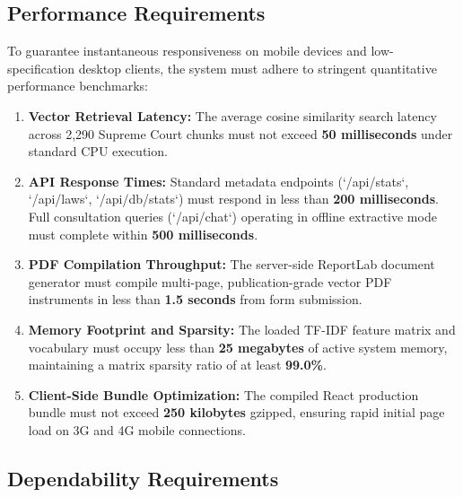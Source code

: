 \subsection{Performance Requirements}
\label{subsec:performance_requirements}

To guarantee instantaneous responsiveness on mobile devices and low-specification desktop clients, the system must adhere to stringent quantitative performance benchmarks:
\begin{enumerate}
    \item \textbf{Vector Retrieval Latency:} The average cosine similarity search latency across 2,290 Supreme Court chunks must not exceed \textbf{50 milliseconds} under standard CPU execution.
    \item \textbf{API Response Times:} Standard metadata endpoints (`/api/stats`, `/api/laws`, `/api/db/stats`) must respond in less than \textbf{200 milliseconds}. Full consultation queries (`/api/chat`) operating in offline extractive mode must complete within \textbf{500 milliseconds}.
    \item \textbf{PDF Compilation Throughput:} The server-side ReportLab document generator must compile multi-page, publication-grade vector PDF instruments in less than \textbf{1.5 seconds} from form submission.
    \item \textbf{Memory Footprint and Sparsity:} The loaded TF-IDF feature matrix and vocabulary must occupy less than \textbf{25 megabytes} of active system memory, maintaining a matrix sparsity ratio of at least \textbf{99.0\%}.
    \item \textbf{Client-Side Bundle Optimization:} The compiled React production bundle must not exceed \textbf{250 kilobytes} gzipped, ensuring rapid initial page load on 3G and 4G mobile connections.
\end{enumerate}

\subsection{Dependability Requirements}
\label{subsec:dependability_requirements}

